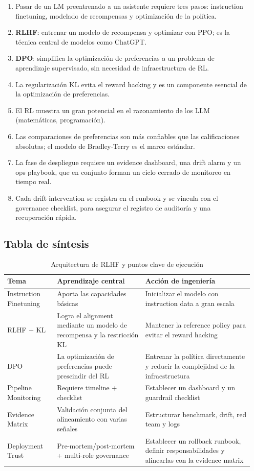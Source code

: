 \documentclass[a4paper]{article}
\begin{document}
\begin{enumerate}
    \item Pasar de un LM preentrenado a un asistente requiere tres pasos: instruction finetuning, modelado de recompensas y optimización de la política.
    \item \textbf{RLHF}: entrenar un modelo de recompensa y optimizar con PPO; es la técnica central de modelos como ChatGPT.
    \item \textbf{DPO}: simplifica la optimización de preferencias a un problema de aprendizaje supervisado, sin necesidad de infraestructura de RL.
    \item La regularización KL evita el reward hacking y es un componente esencial de la optimización de preferencias.
    \item El RL muestra un gran potencial en el razonamiento de los LLM (matemáticas, programación).
    \item Las comparaciones de preferencias son más confiables que las calificaciones absolutas; el modelo de Bradley-Terry es el marco estándar.
    \item La fase de despliegue requiere un evidence dashboard, una drift alarm y un ops playbook, que en conjunto forman un ciclo cerrado de monitoreo en tiempo real.
    \item Cada drift intervention se registra en el runbook y se vincula con el governance checklist, para asegurar el registro de auditoría y una recuperación rápida.
\end{enumerate}

\subsection{Tabla de síntesis}

\begin{table}[H]
\centering
\begin{tabular}{p{} p{} p{}}
\toprule
Tema & Aprendizaje central & Acción de ingeniería \\
\midrule
Instruction Finetuning & Aporta las capacidades básicas & Inicializar el modelo con instruction data a gran escala \\
RLHF + KL & Logra el alignment mediante un modelo de recompensa y la restricción KL & Mantener la reference policy para evitar el reward hacking \\
DPO & La optimización de preferencias puede prescindir del RL & Entrenar la política directamente y reducir la complejidad de la infraestructura \\
Pipeline Monitoring & Requiere timeline + checklist & Establecer un dashboard y un guardrail checklist \\
Evidence Matrix & Validación conjunta del alineamiento con varias señales & Estructurar benchmark, drift, red team y logs \\
Deployment Trust & Pre-mortem/post-mortem + multi-role governance & Establecer un rollback runbook, definir responsabilidades y alinearlas con la evidence matrix \\
\bottomrule
\end{tabular}
\caption{Arquitectura de RLHF y puntos clave de ejecución}
\end{table}
\end{document}
